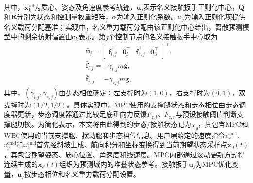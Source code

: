 ﻿\documentclass[preprint,12pt]{elsarticle}
\begin{document}
其中，$\bm x_k^{\text{ref}}$为质心、姿态及角速度参考轨迹，$\bar{\bm u}_j$表示名义接触扳手正则化中心，$\bm Q$和$\bm R$分别为状态和控制量权重矩阵，$\alpha$为输入正则化系数。$\bar{\bm u}_j$为输入正则化项提供名义载荷分配基准；实现中，名义重力载荷分配由该正则化中心给出，离散预测模型中的剩余仿射偏置由$\bm c_k$表示。第$j$个控制节点的名义接触扳手中心取为
\begin{equation}
\begin{aligned}
&\bar{\bm u}_j=
\begin{bmatrix}
\bar{\bm f}_{l,j}^{\top}&\bm 0_3^{\top}&
\bar{\bm f}_{r,j}^{\top}&\bm 0_3^{\top}
\end{bmatrix}^{\top},
\\
&\bar{\bm f}_{l,j}=
-\gamma_{l,j}m\bm g,
\\
&\bar{\bm f}_{r,j}=
-\gamma_{r,j}m\bm g,
\end{aligned}
\label{eq:nominal_wrench}
\end{equation}
其中，$(\gamma_{l,j},\gamma_{r,j})$由步态相位确定：左支撑时为$(1,0)$，右支撑时为$(0,1)$，双支撑时为$(1/2,1/2)$。具体实现中，MPC使用的支撑腿状态和步态相位由步态调度器更新，步态调度器通过比较足底垂向力反馈$F_{z,l}$、$F_{z,r}$与预设接触阈值判断支撑腿切换。为简化表示，本文将由此得到的步态/接触状态记为$\chi_g$，其包含MPC和WBC使用的当前支撑腿、摆动腿和步态相位信息。用户层给定的速度指令$v_x^{\mathrm{cmd}}$、$v_y^{\mathrm{cmd}}$和$\omega_z^{\mathrm{cmd}}$首先经斜坡生成、航向积分和坐标变换得到当前期望状态采样点$\bm x_d(t)$，其包含期望姿态、质心位置、角速度和线速度。MPC内部通过滚动更新方式将连续生成的$\bm x_d(t)$组织为预测域内的堆叠状态参考。接触扳手$\bm u_j$为MPC优化变量，$\bar{\bm u}_j$按步态相位和名义重力载荷分配设置。
\end{document}
